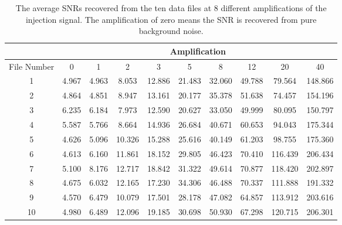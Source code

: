 \documentclass[aps,prd,preprint]{revtex4}
\begin{document}
\begin{table}
	\caption{The average SNRs recovered from the ten data files at 8 different amplifications of the injection signal. The amplification of zero means the SNR is recovered from pure background noise. \label{tab:SNR}}
	\begin{tabular}{c|ccccccccc}
		\hline
		\hline
		& \multicolumn{ 9}{|c}{Amplification} \\
		\hline
		File Number & 0 & 1 & 2 & 3 & 5 & 8 & 12 & 20 & 40 \\
		\hline
		1 & 4.967  & 4.963  & 8.053  & 12.886  & 21.483  & 32.060  & 49.788  & 79.564  & 148.866  \\
		
		2 & 4.864  & 4.851  & 8.947  & 13.161  & 20.177  & 35.378  & 51.638  & 74.457  & 154.196  \\
		
		3 & 6.235  & 6.184  & 7.973  & 12.590  & 20.627  & 33.050  & 49.999  & 80.095  & 150.797  \\
		
		4 & 5.587  & 5.766  & 8.664  & 14.936  & 26.684  & 40.671  & 60.653  & 94.043  & 175.344  \\
		
		5 & 4.626  & 5.096  & 10.326  & 15.288  & 25.616  & 40.149  & 61.203  & 98.755  & 175.360  \\
		
		6 & 4.613  & 6.160  & 11.861  & 18.152  & 29.805  & 46.423  & 70.410  & 116.439  & 206.434  \\
		
		7 & 5.100  & 8.176  & 12.717  & 18.842  & 31.322  & 49.614  & 70.877  & 118.420  & 202.897  \\
		
		8 & 4.675  & 6.032  & 12.165  & 17.230  & 34.306  & 46.488  & 70.337  & 111.888  & 191.332  \\
		
		9 & 4.570  & 6.479  & 10.079  & 17.501  & 28.178  & 47.082  & 64.857  & 113.912  & 203.616  \\
		
		10 & 4.980  & 6.489  & 12.096  & 19.185  & 30.698  & 50.930  & 67.298  & 120.715  & 206.301  \\
		\hline
		\hline
	\end{tabular}  
\end{table}
\end{document}

